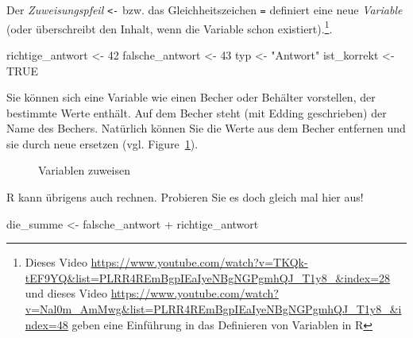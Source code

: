 \documentclass[
  letterpaper,
  DIV=11,
  numbers=noendperiod]{scrartcl}
\newenvironment{Shaded}{\begin{snugshade}}{\end{snugshade}}
\newcommand{\ConstantTok}[1]{\textcolor[rgb]{0.56,0.35,0.01}{#1}}
\newcommand{\DecValTok}[1]{\textcolor[rgb]{0.68,0.00,0.00}{#1}}
\newcommand{\NormalTok}[1]{\textcolor[rgb]{0.00,0.23,0.31}{#1}}
\newcommand{\OtherTok}[1]{\textcolor[rgb]{0.00,0.23,0.31}{#1}}
\newcommand{\SpecialCharTok}[1]{\textcolor[rgb]{0.37,0.37,0.37}{#1}}
\newcommand{\StringTok}[1]{\textcolor[rgb]{0.13,0.47,0.30}{#1}}
\theoremstyle{definition}
\theoremstyle{definition}
\theoremstyle{definition}
\theoremstyle{remark}
\begin{document}
Der \emph{Zuweisungspfeil} \texttt{\textless{}-} bzw. das
Gleichheitszeichen \texttt{=} definiert eine neue \emph{Variable} (oder
überschreibt den Inhalt, wenn die Variable schon existiert).\footnote{Dieses
  Video
  \url{https://www.youtube.com/watch?v=TKQk-tEF9YQ&list=PLRR4REmBgpIEaIyeNBgNGPgmhQJ_T1y8_&index=28}
  und dieses Video
  \url{https://www.youtube.com/watch?v=Nal0m_AmMwg&list=PLRR4REmBgpIEaIyeNBgNGPgmhQJ_T1y8_&index=48}
  geben eine Einführung in das Definieren von Variablen in R}.

\begin{Shaded}
\begin{Highlighting}[]
\NormalTok{richtige\_antwort }\OtherTok{\textless{}{-}} \DecValTok{42}
\NormalTok{falsche\_antwort }\OtherTok{\textless{}{-}} \DecValTok{43}
\NormalTok{typ }\OtherTok{\textless{}{-}} \StringTok{"Antwort"}
\NormalTok{ist\_korrekt }\OtherTok{\textless{}{-}} \ConstantTok{TRUE}
\end{Highlighting}
\end{Shaded}

Sie können sich eine Variable wie einen Becher oder Behälter vorstellen,
der bestimmte Werte enthält. Auf dem Becher steht (mit Edding
geschrieben) der Name des Bechers. Natürlich können Sie die Werte aus
dem Becher entfernen und sie durch neue ersetzen (vgl.
Figure~\ref{fig-def-vars}).

\begin{figure}


\caption{\label{fig-def-vars}Variablen zuweisen}

\end{figure}%

R kann übrigens auch rechnen. Probieren Sie es doch gleich mal hier aus!

\begin{Shaded}
\begin{Highlighting}[]
\NormalTok{die\_summe }\OtherTok{\textless{}{-}}\NormalTok{ falsche\_antwort }\SpecialCharTok{+}\NormalTok{ richtige\_antwort}
\end{Highlighting}
\end{Shaded}
\end{document}
